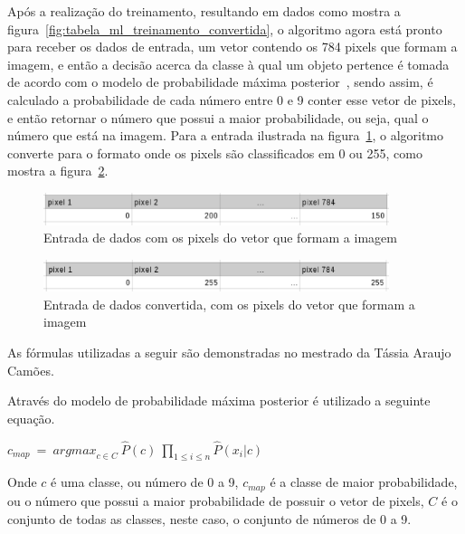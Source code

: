 Após a realização do treinamento, resultando em dados como mostra a
figura~\ref{fig:tabela_ml_treinamento_convertida}, o algoritmo agora está pronto para
receber os dados de entrada, um vetor contendo os 784 pixels que formam a imagem, e então
a decisão acerca da classe à qual um objeto pertence é tomada de acordo com o modelo
de probabilidade máxima posterior~\cite{araujo2011apprecommender}, sendo assim, é
calculado a probabilidade de cada número entre 0 e 9 conter esse vetor de pixels, e então
retornar o número que possui a maior probabilidade, ou seja, qual o número que está na
imagem. Para a entrada ilustrada na figura~\ref{fig:bayes_dado_entrada}, o algoritmo
converte para o formato onde os pixels são classificados em 0 ou 255, como mostra a
figura~\ref{fig:bayes_dado_entrada_convertida}.

\begin{figure}[h]
  \centering
  \includegraphics[width=0.9\textwidth]{figuras/bayes_dado_entrada.eps}
  \caption{Entrada de dados com os pixels do vetor que formam a imagem}
  \label{fig:bayes_dado_entrada}
\end{figure}

\begin{figure}[h]
  \centering
  \includegraphics[width=0.9\textwidth]{figuras/bayes_dado_entrada_convertida.eps}
  \caption{Entrada de dados convertida, com os pixels do vetor que formam a imagem}
  \label{fig:bayes_dado_entrada_convertida}
\end{figure}

As fórmulas utilizadas a seguir são demonstradas no mestrado da Tássia Araujo Camões.

Através do modelo de probabilidade máxima posterior é utilizado a seguinte equação.

\begin{center}

$ c_{map} \ = \ {arg max}_{c \in C} \ \hat{P}(c) \ \prod\limits_{1 \leq i \leq n} \hat{P}(x_i | c)  $
\\
\end{center}

Onde $c$ é uma classe, ou número de 0 a 9, $c_{map}$ é a classe de maior probabilidade,
ou o número que possui a maior probabilidade de possuir o vetor de pixels, $C$ é o
conjunto de todas as classes, neste caso, o conjunto de números de 0 a 9.

